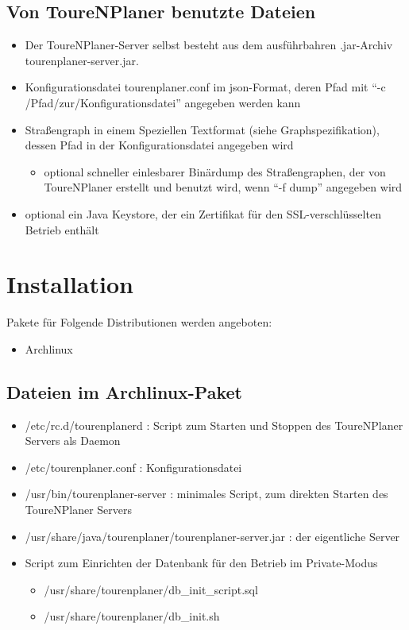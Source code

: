 \documentclass[ngerman,titlepage,parskip=true]{scrartcl}
\begin{document}
	\label{usedfiles}
  \subsection{Von ToureNPlaner benutzte Dateien}
	 \begin{itemize}
	   \item Der ToureNPlaner-Server selbst besteht aus dem ausf\"uhrbahren .jar-Archiv tourenplaner-server.jar.
	   \item Konfigurationsdatei tourenplaner.conf im json-Format, deren Pfad mit ``-c /Pfad/zur/Konfigurationsdatei'' angegeben werden kann
	   \item Stra\ss{}engraph in einem Speziellen Textformat (siehe Graphspezifikation), dessen Pfad in der Konfigurationsdatei angegeben wird
		\begin{itemize}
		  \item optional schneller einlesbarer Bin\"ardump des Stra\ss{}engraphen, der von ToureNPlaner erstellt und benutzt wird, wenn ``-f dump'' angegeben wird
		\end{itemize}
	   \item optional ein Java Keystore, der ein Zertifikat f\"ur den SSL-verschl\"usselten Betrieb enth\"alt
	 \end{itemize}

\section{Installation}
  Pakete f\"ur Folgende Distributionen werden angeboten:
  \begin{itemize}
    \item Archlinux
  \end{itemize}
  \subsection{Dateien im Archlinux-Paket}
	\begin{itemize}
	  \item /etc/rc.d/tourenplanerd : Script zum Starten und Stoppen des ToureNPlaner Servers als Daemon
	  \item /etc/tourenplaner.conf : Konfigurationsdatei
	  \item /usr/bin/tourenplaner-server : minimales Script, zum direkten Starten des ToureNPlaner Servers
	  \item /usr/share/java/tourenplaner/tourenplaner-server.jar : der eigentliche Server
	  \item Script zum Einrichten der Datenbank f\"ur den Betrieb im Private-Modus
		\begin{itemize}
		  \item /usr/share/tourenplaner/db\_init\_script.sql
		  \item /usr/share/tourenplaner/db\_init.sh
		\end{itemize}
	\end{itemize}
\end{document}
